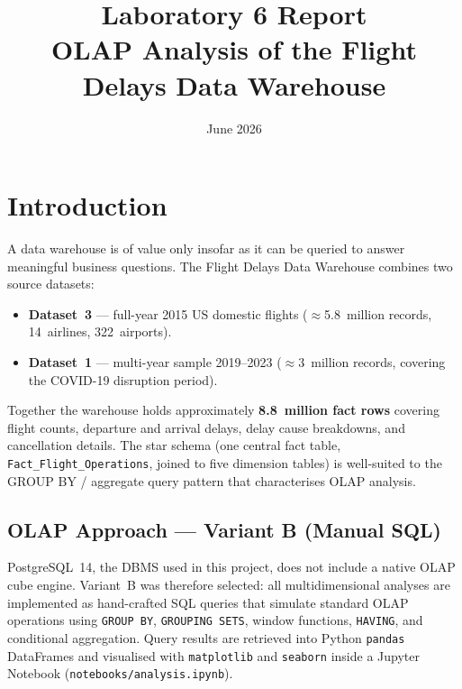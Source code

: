 \documentclass[12pt,a4paper]{article}
\title{\textbf{Laboratory 6 Report}\\[0.5em]
\large OLAP Analysis of the Flight Delays Data Warehouse}
\date{June 2026}
\begin{document}
\maketitle
\tableofcontents
\newpage

\section{Introduction}

A data warehouse is of value only insofar as it can be queried to answer
meaningful business questions. The Flight Delays Data Warehouse combines two
source datasets:

\begin{itemize}
    \item \textbf{Dataset~3} — full-year 2015 US domestic flights
          ($\approx$5.8~million records, 14~airlines, 322~airports).
    \item \textbf{Dataset~1} — multi-year sample 2019–2023
          ($\approx$3~million records, covering the COVID-19 disruption
          period).
\end{itemize}

Together the warehouse holds approximately \textbf{8.8~million fact rows}
covering flight counts, departure and arrival delays, delay cause breakdowns,
and cancellation details. The star schema (one central fact table,
\texttt{Fact\_Flight\_Operations}, joined to five dimension tables) is
well-suited to the GROUP BY / aggregate query pattern that characterises OLAP
analysis.

\subsection*{OLAP Approach — Variant B (Manual SQL)}

PostgreSQL~14, the DBMS used in this project, does not include a native OLAP
cube engine. Variant~B was therefore selected: all multidimensional analyses
are implemented as hand-crafted SQL queries that simulate standard OLAP
operations using \texttt{GROUP BY}, \texttt{GROUPING SETS}, window functions,
\texttt{HAVING}, and conditional aggregation. Query results are retrieved into
Python \texttt{pandas} DataFrames and visualised with \texttt{matplotlib} and
\texttt{seaborn} inside a Jupyter Notebook
(\texttt{notebooks/analysis.ipynb}).

\end{document}
